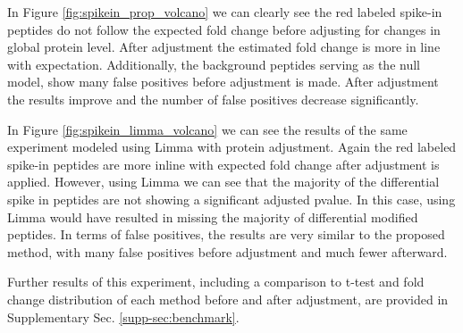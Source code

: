 \documentclass[mcp]{article}
\numberwithin{table}{section}
\def\todo#1{{\color{red}[#1]}}
\begin{document}
In Figure \ref{fig:spikein_prop_volcano} we can clearly see the red labeled spike-in peptides do not follow the expected fold change before adjusting for changes in global protein level. After adjustment the estimated fold change is more in line with expectation. Additionally, the background peptides serving as the null model, show many false positives before adjustment is made. After adjustment the results improve and the number of false positives decrease significantly. 

In Figure \ref{fig:spikein_limma_volcano} we can see the results of the same experiment modeled using Limma with protein adjustment. Again the red labeled spike-in peptides are more inline with expected fold change after adjustment is applied. However, using Limma we can see that the majority of the differential spike in peptides are not showing a significant adjusted pvalue. In this case, using Limma would have resulted in missing the majority of differential modified peptides.  In terms of false positives, the results are very similar to the proposed method, with many false positives before adjustment and much fewer afterward.

Further results of this experiment, including a comparison to t-test and fold change distribution of each method before and after adjustment, are provided in Supplementary Sec. \ref{supp-sec:benchmark}. 


\end{document}
